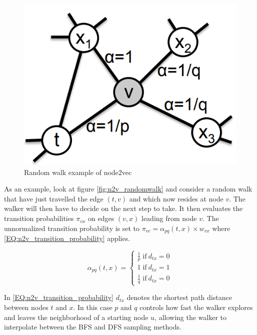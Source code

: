 \begin{figure}[H]
\centering
  \includegraphics[scale=0.5]{Article/figures/randomwalkexample.png}
  \caption{Random walk example of node2vec \cite{Node2vec}}
  \label{fig:n2v_randomwalk}
\end{figure}

As an example, look at figure \autoref{fig:n2v_randomwalk} and consider a random walk that have just travelled the edge $(t, v)$ and which now resides at node $v$. The walker will then have to decide on the next step to take. It then evaluates the transition probabilities $\pi_{vx}$ on edges $(v,x)$ leading from node $v$. The unnormalized transition probability is set to $\pi_{vc} = \alpha_{pq} (t,x) \times w_{vx}$ where \autoref{EQ:n2v_transition_probability} applies.

\begin{equation}\label{EQ:n2v_transition_probability}
\alpha_{pq} (t,x) =
\begin{cases} 
	\frac{1}{p} \; \text{if} \:  d_{tx} = 0 \\
	1 \; \text{if} \: d_{tx} = 1 \\
	\frac{1}{q} \; \text{if} \: d_{tx} = 0
\end{cases}
\end{equation}

In \autoref{EQ:n2v_transition_probability} $d_{tx}$ denotes the shortest path distance between nodes $t$ and $x$. In this case $p$ and $q$ controls how fast the walker explores and leaves the neighborhood of a starting node $u$, allowing the walker to interpolate between the BFS and DFS sampling methods.

